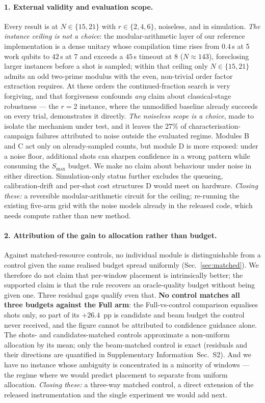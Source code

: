 \documentclass[preprint,11pt]{elsarticle}
\newcommand{\SI}{Supplementary Information}
\newcommand{\SItables}{\SI{}~Sec.~S2}
\newcommand{\Smax}{S_{\max}}
\begin{document}
\paragraph{1. External validity and evaluation scope.}
Every result is at $N\in\{15,21\}$ with $r\in\{2,4,6\}$, noiseless, and
in simulation. \emph{The instance ceiling is not a choice}: the
modular-arithmetic layer of our reference implementation is a dense
unitary whose compilation time rises from $0.4$\,s at 5 work qubits to
$42$\,s at 7 and exceeds a $45$\,s timeout at 8 ($N\approx143$),
foreclosing larger instances before a shot is sampled; within that
ceiling only $N\in\{15,21\}$ admits an odd two-prime modulus with the
even, non-trivial order factor extraction requires. At these orders the
continued-fraction search is very forgiving, and that forgiveness
confounds \emph{any} claim about classical-stage robustness --- the $r=2$
instance, where the unmodified baseline already succeeds on every trial,
demonstrates it directly. \emph{The noiseless scope is a choice}, made to
isolate the mechanism under test, and it leaves the 27\% of
characterisation-campaign failures attributed to noise outside the
evaluated regime. Modules B and C act only on already-sampled counts, but
module D is more exposed: under a noise floor, additional shots can
sharpen confidence in a wrong pattern while consuming the $\Smax$ budget.
We make no claim about behaviour under noise in either direction.
Simulation-only status further excludes the queueing, calibration-drift
and per-shot cost structures D would meet on hardware. \emph{Closing
these:} a reversible modular-arithmetic circuit \cite{cuccaro2004} for
the ceiling; re-running the existing five-arm grid with the noise models
already in the released code, which needs compute rather than new
method.

\paragraph{2. Attribution of the gain to allocation rather than budget.}
Against matched-resource controls, no individual module is
distinguishable from a control given the same realised budget spread
uniformly (Sec.~\ref{sec:matched}). We therefore do not claim that
per-window placement is intrinsically better; the supported claim is that
the rule recovers an oracle-quality budget without being given one. Three
residual gaps qualify even that. \textbf{No control matches all three
budgets against the Full arm}: the Full-vs-control comparison equalises
shots only, so part of its $+26.4$~pp is candidate and beam budget the
control never received, and the figure cannot be attributed to confidence
guidance alone. The shots- and candidates-matched controls approximate a
non-uniform allocation by its mean; only the beam-matched control is
exact (residuals and their directions are quantified in \SItables{}). And
we have no instance whose ambiguity is concentrated in a minority of
windows --- the regime where we would predict placement to separate from
uniform allocation. \emph{Closing these:} a three-way matched control, a
direct extension of the released instrumentation and the single
experiment we would add next.
\end{document}
